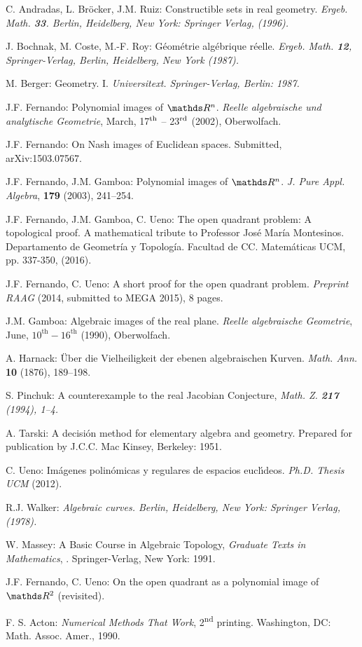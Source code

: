 \documentclass[11pt, a4paper, english, twoside, notitlepage, openright]{report}
\begin{document}
\begin{thebibliography}{ABR}

 C. Andradas, L. Br\"ocker, J.M. Ruiz: Constructible 
sets in real geometry. \em Ergeb. Math. \em{\bf 33}. Berlin, Heidelberg, 
New York: Springer Verlag, (1996).

 J. Bochnak, M. Coste, M.-F. Roy: G\'eom\'etrie
alg\'ebrique r\'eelle. \em Ergeb. Math. \em {\bf 12}, Springer-Verlag,
Berlin, Heidelberg, New York (1987).

 M. Berger: Geometry. I. \em Universitext\em. Springer-Verlag, Berlin: 1987.

 J.F. Fernando: Polynomial images of $\R^n$. {\em Reelle algebraische und analytische Geometrie}, March, 17$^{\rm th}$ -- 23$^{\rm rd}$ (2002), Oberwolfach.

 J.F. Fernando: On Nash images of Euclidean spaces. Submitted, arXiv:1503.07567.

 J.F. Fernando, J.M. Gamboa: Polynomial images of $\R^n$. {\em J. Pure Appl. Algebra}, {\bf179} (2003), 241--254.


 J.F. Fernando, J.M. Gamboa, C. Ueno: The open quadrant problem:
A topological proof.  A mathematical tribute to Professor Jos\'e Mar\'ia Montesinos. Departamento de Geometr\'ia y Topolog\'ia. Facultad de CC. Matem\'aticas UCM, pp. 337-350, (2016).

 J.F. Fernando, C. Ueno: A short proof for the open quadrant problem.
\textit{Preprint RAAG} (2014, submitted to MEGA 2015), 8 pages.

 J.M. Gamboa: Algebraic images of the real plane. \textit{Reelle algebraische Geometrie}, June,
$10^{\text{th}}-16^{\text{th}}$ (1990), Oberwolfach.

 A. Harnack: \"Uber die Vielheiligkeit der ebenen algebraischen Kurven. {\em Math. Ann.} {\bf10} (1876), 189--198.

 S. Pinchuk: A counterexample to the real Jacobian Conjecture, \em Math. Z.
\em {\bf 217} (1994), 1--4.

 A. Tarski: A decisi\'on method for elementary algebra and geometry. Prepared for publication by J.C.C. Mac Kinsey, Berkeley: 1951.

 C. Ueno: Im\'agenes polin\'omicas y regulares de espacios eucl\'\i deos. {\em Ph.D. Thesis UCM} (2012).

 R.J. Walker: \em Algebraic curves. \em Berlin, Heidelberg, 
New York: Springer Verlag, (1978).

 W. Massey: A Basic Course in Algebraic Topology, \emph{Graduate Texts in Mathematics}, \textbf{}.
Springer-Verlag, New York: 1991.

 J.F. Fernando, C. Ueno: On the open quadrant as a polynomial image of $\R^2$ (revisited).

 F. S. Acton: \textit{Numerical Methods That Work}, 2\textsuperscript{nd} printing. Washington, DC: Math. Assoc. Amer., 1990. 


\end{thebibliography}
\end{document}
